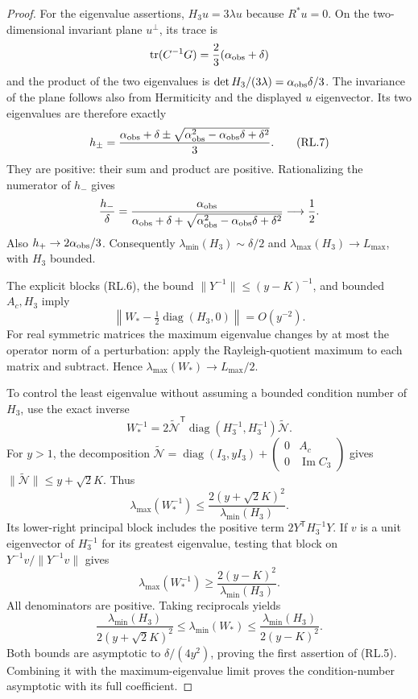 \begin{proof}
For the eigenvalue assertions, $H_3u=3\lambda u$ because $R^*u=0$.
On the two-dimensional invariant plane $u^\perp$, its trace is
\[
 \operatorname{tr}(C^{-1}G)
      =\frac23(\alpha_{\rm obs}+\delta)
\]
and the product of the two eigenvalues is
$\det H_3/(3\lambda)=\alpha_{\rm obs}\delta/3$.
The invariance of the plane follows also from Hermiticity and the
displayed $u$ eigenvector.  Its two eigenvalues are therefore exactly
\[
 h_\pm=
 \frac{\alpha_{\rm obs}+\delta
       \pm\sqrt{\alpha_{\rm obs}^2-\alpha_{\rm obs}\delta+\delta^2}}3.
                                                               \tag{RL.7}
\]
They are positive: their sum and product are positive.  Rationalizing
the numerator of $h_-$ gives
\[
 \frac{h_-}{\delta}
 =\frac{\alpha_{\rm obs}}
 {\alpha_{\rm obs}+\delta+
       \sqrt{\alpha_{\rm obs}^2-\alpha_{\rm obs}\delta+\delta^2}}
 \longrightarrow\frac12.
\]
Also $h_+\to2\alpha_{\rm obs}/3$.
Consequently $\lambda_{\min}(H_3)\sim\delta/2$ and
$\lambda_{\max}(H_3)\to L_{\max}$, with $H_3$ bounded.

The explicit blocks (RL.6), the bound
$\|Y^{-1}\|\leq(y-K)^{-1}$, and bounded $A_c,H_3$ imply
\[
 \left\|W_*-\tfrac12\operatorname{diag}(H_3,0)\right\|
 =O(y^{-2}).
\]
For real symmetric matrices the maximum eigenvalue changes by at most
the operator norm of a perturbation: apply the Rayleigh-quotient maximum
to each matrix and subtract.  Hence
$\lambda_{\max}(W_*)\to L_{\max}/2$.

To control the least eigenvalue without assuming a bounded condition
number of $H_3$, use the exact inverse
\[
 W_*^{-1}
 =2\widetilde{\mathcal N}^{\mathsf T}
      \operatorname{diag}(H_3^{-1},H_3^{-1})
      \widetilde{\mathcal N}.
\]
For $y>1$, the decomposition
$\widetilde{\mathcal N}=\operatorname{diag}(I_3,yI_3)
+\left(\begin{smallmatrix}0&A_c\\0&\operatorname{Im}C_3\end{smallmatrix}\right)$
gives $\|\widetilde{\mathcal N}\|\leq y+\sqrt2K$.
Thus
\[
 \lambda_{\max}(W_*^{-1})
 \leq\frac{2(y+\sqrt2K)^2}{\lambda_{\min}(H_3)}.
\]
Its lower-right principal block includes the positive term
$2Y^{\mathsf T}H_3^{-1}Y$.  If $v$ is a unit eigenvector of
$H_3^{-1}$ for its greatest eigenvalue, testing that block on
$Y^{-1}v/\|Y^{-1}v\|$ gives
\[
 \lambda_{\max}(W_*^{-1})
 \geq\frac{2(y-K)^2}{\lambda_{\min}(H_3)}.
\]
All denominators are positive.  Taking reciprocals yields
\[
 \frac{\lambda_{\min}(H_3)}{2(y+\sqrt2K)^2}
 \leq\lambda_{\min}(W_*)
 \leq\frac{\lambda_{\min}(H_3)}{2(y-K)^2}.                     \tag{RL.8}
\]
Both bounds are asymptotic to $\delta/(4y^2)$, proving the first
assertion of (RL.5).  Combining it with the maximum-eigenvalue limit
proves the condition-number asymptotic with its full coefficient.
\end{proof}

